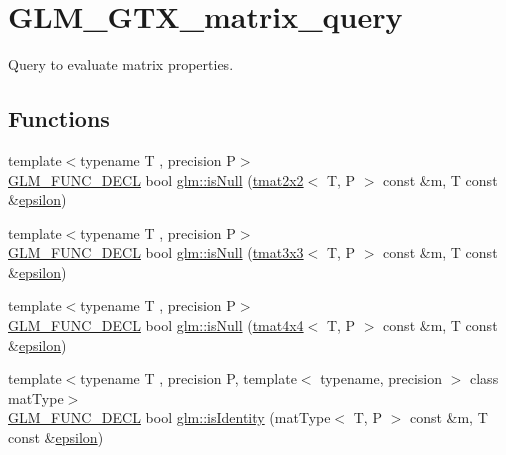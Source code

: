\hypertarget{group__gtx__matrix__query}{}\section{G\+L\+M\+\_\+\+G\+T\+X\+\_\+matrix\+\_\+query}
\label{group__gtx__matrix__query}


Query to evaluate matrix properties.  


\subsection*{Functions}
\begin{DoxyCompactItemize}
\item 
{\footnotesize template$<$typename T , precision P$>$ }\\\mbox{\hyperlink{setup_8hpp_ab2d052de21a70539923e9bcbf6e83a51}{G\+L\+M\+\_\+\+F\+U\+N\+C\+\_\+\+D\+E\+CL}} bool \mbox{\hyperlink{group__gtx__matrix__query_ga37e535cbeaea383b8c1247b98875cd4b}{glm\+::is\+Null}} (\mbox{\hyperlink{structglm_1_1tmat2x2}{tmat2x2}}$<$ T, P $>$ const \&m, T const \&\mbox{\hyperlink{group__gtc__constants_ga2a1e57fc5592b69cfae84174cbfc9429}{epsilon}})
\item 
{\footnotesize template$<$typename T , precision P$>$ }\\\mbox{\hyperlink{setup_8hpp_ab2d052de21a70539923e9bcbf6e83a51}{G\+L\+M\+\_\+\+F\+U\+N\+C\+\_\+\+D\+E\+CL}} bool \mbox{\hyperlink{group__gtx__matrix__query_gac67a5c7e029a84b74b02ac9599b8972d}{glm\+::is\+Null}} (\mbox{\hyperlink{structglm_1_1tmat3x3}{tmat3x3}}$<$ T, P $>$ const \&m, T const \&\mbox{\hyperlink{group__gtc__constants_ga2a1e57fc5592b69cfae84174cbfc9429}{epsilon}})
\item 
{\footnotesize template$<$typename T , precision P$>$ }\\\mbox{\hyperlink{setup_8hpp_ab2d052de21a70539923e9bcbf6e83a51}{G\+L\+M\+\_\+\+F\+U\+N\+C\+\_\+\+D\+E\+CL}} bool \mbox{\hyperlink{group__gtx__matrix__query_ga326de496972051413c7b44b85fc9cb6e}{glm\+::is\+Null}} (\mbox{\hyperlink{structglm_1_1tmat4x4}{tmat4x4}}$<$ T, P $>$ const \&m, T const \&\mbox{\hyperlink{group__gtc__constants_ga2a1e57fc5592b69cfae84174cbfc9429}{epsilon}})
\item 
{\footnotesize template$<$typename T , precision P, template$<$ typename, precision $>$ class mat\+Type$>$ }\\\mbox{\hyperlink{setup_8hpp_ab2d052de21a70539923e9bcbf6e83a51}{G\+L\+M\+\_\+\+F\+U\+N\+C\+\_\+\+D\+E\+CL}} bool \mbox{\hyperlink{group__gtx__matrix__query_gafc1ce12c738b8c5d007179e615609330}{glm\+::is\+Identity}} (mat\+Type$<$ T, P $>$ const \&m, T const \&\mbox{\hyperlink{group__gtc__constants_ga2a1e57fc5592b69cfae84174cbfc9429}{epsilon}})

\end{DoxyCompactItemize}
